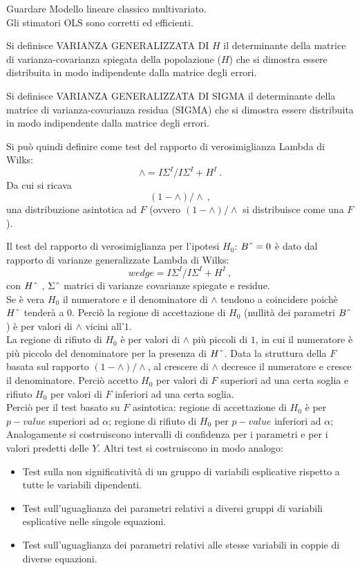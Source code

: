 \documentclass[a4page, 11pt]{article} %
\begin{document}
Guardare Modello lineare classico multivariato.\\
Gli stimatori OLS sono corretti ed efficienti. 

Si definisce VARIANZA GENERALIZZATA DI $H$ il determinante della matrice di varianza-covarianza spiegata della popolazione ($H$) che si dimostra essere distribuita in modo indipendente dalla matrice degli errori.

Si definisce VARIANZA GENERALIZZATA DI SIGMA il determinante della matrice di varianza-covarianza residua (SIGMA) che si dimostra essere distribuita in modo indipendente dalla matrice degli errori.

Si può quindi definire come test del rapporto di verosimiglianza Lambda di Wilks: \begin{equation*}
\wedge=I\Sigma^{I} /I \Sigma^{I} + H^{I}\ . 
\end{equation*}
Da cui si ricava 
\begin{equation*}
(1- \wedge ) / \wedge \ ,
\end{equation*}
una distribuzione asintotica ad $F$ (ovvero $(1-\wedge)/ \wedge$ si distribuisce come una $F$).

Il test del rapporto di verosimiglianza per l’ipotesi $H_0$: $B\string^ = 0$ è dato dal rapporto di varianze generalizzate Lambda di Wilks: 
\begin{equation*}
wedge=I\Sigma^{I} /I \Sigma^{I} + H^{I} \ , 
\end{equation*} 
con $H\string^$ , $\Sigma\string^$ matrici di varianze covarianze spiegate e residue.\\
Se è vera $H_0$ il numeratore e il denominatore di $\wedge$ tendono a coincidere poichè $H\string^$ tenderà a $0$. Perciò la regione di accettazione di $H_0$ (nullità dei parametri $B\string^$) è per valori di $\wedge$ vicini all’$1$.\\
La regione di rifiuto di $H_0$ è per valori di $\wedge$ più piccoli di $1$, in cui il numeratore è più piccolo del denominatore per la presenza di $H\string^$.
Data la struttura della $F$ basata sul rapporto $(1- \wedge )/  \wedge$, al crescere di $\wedge$ decresce il numeratore e cresce il denominatore.
Perciò accetto $H_0$ per valori di $F$ superiori ad una certa soglia e rifiuto $H_0$ per valori di $F$ inferiori ad una certa soglia.\\
Perciò per il test basato su $F$ asintotica:
regione di accettazione di $H_0$ è per $p-value$ superiori ad $\alpha$;
regione di rifiuto di $H_0$ per $p-value$ inferiori ad $\alpha$;
Analogamente si costruiscono intervalli di confidenza per i parametri e per i valori predetti delle $Y$.
\newline
Altri test si costruiscono in modo analogo:
\begin{itemize}[noitemsep]
\item Test sulla non significatività di un gruppo di variabili esplicative rispetto a tutte le variabili dipendenti.
\item Test sull’uguaglianza dei parametri relativi a diversi gruppi di variabili esplicative nelle singole equazioni.
\item Test sull'uguaglianza dei parametri relativi alle stesse variabili in coppie di diverse equazioni.
\end{itemize}
\end{document}
